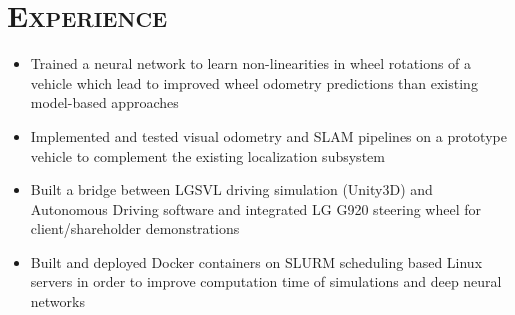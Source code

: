 \documentclass[11pt,a4paper,roman]{moderncv} %
\begin{document}

\vspace{20pt}
\section{\scshape{\huge Experience}}
\vspace{10pt}
{
\begin{itemize}
\item Trained a neural network to learn non-linearities in wheel rotations of a vehicle which lead to improved wheel odometry predictions than 
existing model-based approaches
\item Implemented and tested visual odometry and SLAM pipelines on a prototype vehicle to complement the existing localization subsystem
\item Built a bridge between LGSVL driving simulation (Unity3D) and Autonomous Driving software and integrated LG G920 steering wheel 
for client/shareholder demonstrations
\item Built and deployed Docker containers on SLURM scheduling based Linux servers in order to improve computation time of simulations and deep neural networks
\end{itemize}
}
\end{document}
